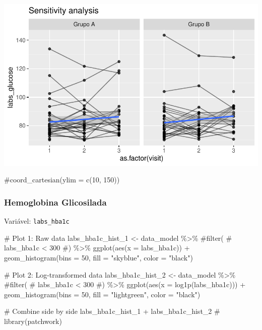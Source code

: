 \documentclass[
  letterpaper,
  DIV=11,
  numbers=noendperiod]{scrartcl}
\newenvironment{Shaded}{\begin{snugshade}}{\end{snugshade}}
\newcommand{\AttributeTok}[1]{\textcolor[rgb]{0.40,0.45,0.13}{#1}}
\newcommand{\CommentTok}[1]{\textcolor[rgb]{0.37,0.37,0.37}{#1}}
\newcommand{\DecValTok}[1]{\textcolor[rgb]{0.68,0.00,0.00}{#1}}
\newcommand{\FunctionTok}[1]{\textcolor[rgb]{0.28,0.35,0.67}{#1}}
\newcommand{\NormalTok}[1]{\textcolor[rgb]{0.00,0.23,0.31}{#1}}
\newcommand{\OtherTok}[1]{\textcolor[rgb]{0.00,0.23,0.31}{#1}}
\newcommand{\SpecialCharTok}[1]{\textcolor[rgb]{0.37,0.37,0.37}{#1}}
\newcommand{\StringTok}[1]{\textcolor[rgb]{0.13,0.47,0.30}{#1}}
\begin{document}
\includegraphics{Outcomes_V1V2V3_files/figure-pdf/labs_glucose_6-2.pdf}

\begin{Shaded}
\begin{Highlighting}[]
    \CommentTok{\#coord\_cartesian(ylim = c(10, 150))}
\end{Highlighting}
\end{Shaded}

\subsubsection{Hemoglobina Glicosilada}\label{hemoglobina-glicosilada}

Variável: \texttt{labs\_hba1c}

\begin{Shaded}
\begin{Highlighting}[]
\CommentTok{\# Plot 1: Raw data}
\NormalTok{labs\_hba1c\_hist\_1 }\OtherTok{\textless{}{-}}\NormalTok{ data\_model }\SpecialCharTok{\%\textgreater{}\%} 
    \CommentTok{\#filter(}
    \CommentTok{\#    labs\_hba1c \textless{} 300}
    \CommentTok{\#) \%\textgreater{}\% }
    \FunctionTok{ggplot}\NormalTok{(}\FunctionTok{aes}\NormalTok{(}\AttributeTok{x =}\NormalTok{ labs\_hba1c)) }\SpecialCharTok{+} 
    \FunctionTok{geom\_histogram}\NormalTok{(}\AttributeTok{bins =} \DecValTok{50}\NormalTok{, }\AttributeTok{fill =} \StringTok{"skyblue"}\NormalTok{, }\AttributeTok{color =} \StringTok{"black"}\NormalTok{)}

\CommentTok{\# Plot 2: Log{-}transformed data}
\NormalTok{labs\_hba1c\_hist\_2 }\OtherTok{\textless{}{-}}\NormalTok{ data\_model }\SpecialCharTok{\%\textgreater{}\%} 
    \CommentTok{\#filter(}
    \CommentTok{\#    labs\_hba1c \textless{} 300}
    \CommentTok{\#) \%\textgreater{}\%}
    \FunctionTok{ggplot}\NormalTok{(}\FunctionTok{aes}\NormalTok{(}\AttributeTok{x =} \FunctionTok{log1p}\NormalTok{(labs\_hba1c))) }\SpecialCharTok{+} 
    \FunctionTok{geom\_histogram}\NormalTok{(}\AttributeTok{bins =} \DecValTok{50}\NormalTok{, }\AttributeTok{fill =} \StringTok{"lightgreen"}\NormalTok{, }\AttributeTok{color =} \StringTok{"black"}\NormalTok{)}

\CommentTok{\# Combine side by side}
\NormalTok{labs\_hba1c\_hist\_1 }\SpecialCharTok{+}\NormalTok{ labs\_hba1c\_hist\_2 }\CommentTok{\# library(patchwork)}
\end{Highlighting}
\end{Shaded}
\end{document}
